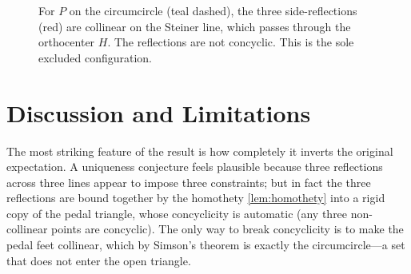 \documentclass[11pt,a4paper]{article}
\theoremstyle{definition}
\newcommand{\circc}{\Gamma}
\begin{document}
\begin{figure}[h]
\centering
{}
\caption{For $P$ on the circumcircle (teal dashed), the three side-reflections (red) are collinear on the Steiner line, which passes through the orthocenter $H$. The reflections are not concyclic. This is the sole excluded configuration.}
\label{fig:steiner}
\end{figure}

\section{Discussion and Limitations}\label{sec:disc}

The most striking feature of the result is how completely it inverts the original expectation. A uniqueness conjecture feels plausible because three reflections across three lines appear to impose three constraints; but in fact the three reflections are bound together by the homothety \cref{lem:homothety} into a rigid copy of the pedal triangle, whose concyclicity is automatic (any three non-collinear points are concyclic). The only way to break concyclicity is to make the pedal feet collinear, which by Simson's theorem is exactly the circumcircle---a set that does not enter the open triangle.
\end{document}
